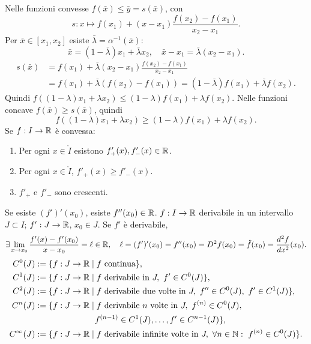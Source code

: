 \begin{center}\end{center}
Nelle funzioni convesse $f(\bar x)\le\bar y=s(\bar x)$, con
\[s:x\mapsto f(x_1)+(x-x_1)\frac{f(x_2)-f(x_1)}{x_2-x_1}.\]
Per $\bar x\in[x_1,x_2]$ esiste $\bar\lambda=\alpha^{-1}(\bar x)$:
\[\bar x=(1-\bar\lambda)x_1+\bar\lambda x_2,\quad\bar x-x_1=\bar\lambda(x_2-x_1).\]
\begin{align*}s(\bar x)&=f(x_1)+\bar\lambda(x_2-x_1)\frac{f(x_2)-f(x_1)}{x_2-x_1}\\&=f(x_1)+\bar\lambda(f(x_2)-f(x_1))=(1-\bar\lambda)f(x_1)+\bar\lambda f(x_2).\end{align*}
Quindi $f((1-\lambda)x_1+\lambda x_2)\le(1-\lambda)f(x_1)+\lambda f(x_2)$.
Nelle funzioni concave $f(\bar x)\ge s(\bar x)$, quindi
\[f((1-\lambda)x_1+\lambda x_2)\ge(1-\lambda)f(x_1)+\lambda f(x_2).\]
Se $f:I\to\mathbb R$ è convessa:
\begin{enumerate}\item Per ogni $x\in\mathring I$ esistono $f'_+(x),f'_-(x)\in\mathbb R$.
\item Per ogni $x\in\mathring I$, $f'_+(x)\ge f'_-(x)$.
\item $f'_+$ e $f'_-$ sono crescenti.\end{enumerate}
Se esiste $(f')'(x_0)$, esiste $f''(x_0)\in\mathbb R$.
$f:I\to\mathbb R$ derivabile in un intervallo $J\subset I$; $f':J\to\mathbb R$, $x_0\in J$.
Se $f'$ è derivabile,
\[\exists\lim_{x\to x_0}\frac{f'(x)-f'(x_0)}{x-x_0}=\ell\in\mathbb R,\quad
\ell=(f')'(x_0)=f''(x_0)=D^2f(x_0)=\ddot f(x_0)=\frac{d^2f}{dx^2}(x_0).\]
\begin{align*}
C^0(J)&:=\{f:J\to\R\mid f\text{ continua}\},\\
C^1(J)&:=\{f:J\to\R\mid f\text{ derivabile in }J,\ f'\in C^0(J)\},\\
C^2(J)&:=\{f:J\to\R\mid f\text{ derivabile due volte in }J,\ f''\in C^0(J),\ f'\in C^1(J)\},\\
C^n(J)&:=\{f:J\to\R\mid f\text{ derivabile }n\text{ volte in }J,\ f^{(n)}\in C^0(J),\\&\hspace{25mm}f^{(n-1)}\in C^1(J),\ldots,f'\in C^{n-1}(J)\},\\
C^\infty(J)&:=\{f:J\to\R\mid f\text{ derivabile infinite volte in }J,\ \forall n\in\N:\ f^{(n)}\in C^0(J)\}.
\end{align*}
